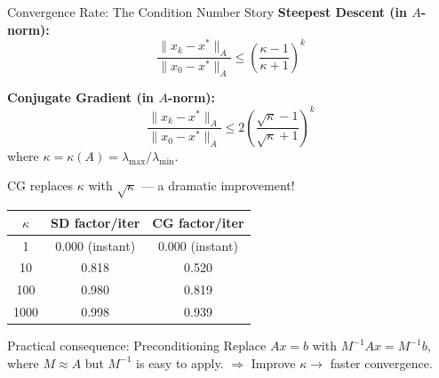 \documentclass[aspectratio=169]{beamer}
\begin{document}
\begin{frame}{Convergence Rate: The Condition Number Story}
    \textbf{Steepest Descent (in $A$-norm):}
    \[
        \frac{\|x_k - x^*\|_A}{\|x_0 - x^*\|_A}
        \leq \left( \frac{\kappa - 1}{\kappa + 1} \right)^k
    \]

    \textbf{Conjugate Gradient (in $A$-norm):}
    \[
        \frac{\|x_k - x^*\|_A}{\|x_0 - x^*\|_A}
        \leq 2 \left( \frac{\sqrt{\kappa} - 1}{\sqrt{\kappa} + 1} \right)^k
    \]
    where $\kappa = \kappa(A) = \lambda_{\max} / \lambda_{\min}$.

    \pause
    \vspace{0.2cm}
    \begin{alertblock}{CG replaces $\kappa$ with $\sqrt{\kappa}$ --- a dramatic improvement!}
        \begin{tabular}{c|c|c}
            $\kappa$ & SD factor/iter & CG factor/iter \\
            \hline
            1        & 0.000 (instant) & 0.000 (instant) \\
            10       & 0.818 & 0.520 \\
            100      & 0.980 & 0.819 \\
            1000     & 0.998 & 0.939 \\
        \end{tabular}
    \end{alertblock}

    \pause
    \vspace{0.2cm}
    \begin{block}{Practical consequence: Preconditioning}
        Replace $Ax = b$ with $M^{-1}Ax = M^{-1}b$,
        where $M \approx A$ but $M^{-1}$ is easy to apply.
        $\Rightarrow$ Improve $\kappa \to$ faster convergence.
    \end{block}
\end{frame}
\end{document}
